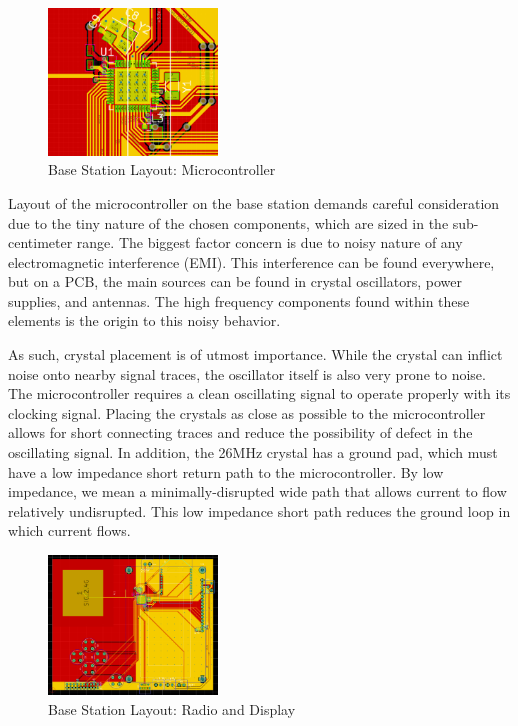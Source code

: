 \documentclass[journal,compsoc]{IEEEtran}
\begin{document}
\begin{figure}[ht] 	%
\centering
\includegraphics[width=0.4\textwidth]{base-layout-uc.PNG}
\caption{ \space Base Station Layout: Microcontroller}
\label{base-lay-uc}
\end{figure}
Layout of the microcontroller on the base station demands careful consideration due to the tiny nature of the chosen components, which are sized in the sub-centimeter range. The biggest factor concern is due to noisy nature of any electromagnetic interference (EMI). This interference can be found everywhere, but on a PCB, the main sources can be found in crystal oscillators, power supplies, and antennas. The high frequency components found within these elements is the origin to this noisy behavior.

As such, crystal placement is of utmost importance. While the crystal can inflict noise onto nearby signal traces, the oscillator itself is also very prone to noise. The microcontroller requires a clean oscillating signal to operate properly with its clocking signal. Placing the crystals as close as possible to the microcontroller allows for short connecting traces and reduce the possibility of defect in the oscillating signal. In addition, the 26MHz crystal has a ground pad, which must have a low impedance short return path to the microcontroller. By low impedance, we mean a minimally-disrupted wide path that allows current to flow relatively undisrupted. This low impedance short path reduces the ground loop in which current flows.
\begin{figure}[ht] 	%
\centering
\includegraphics[width=0.4\textwidth]{base-layout-full.PNG}
\caption{ \space Base Station Layout: Radio and Display}
\label{base-lay-full}
\end{figure}
\end{document}
